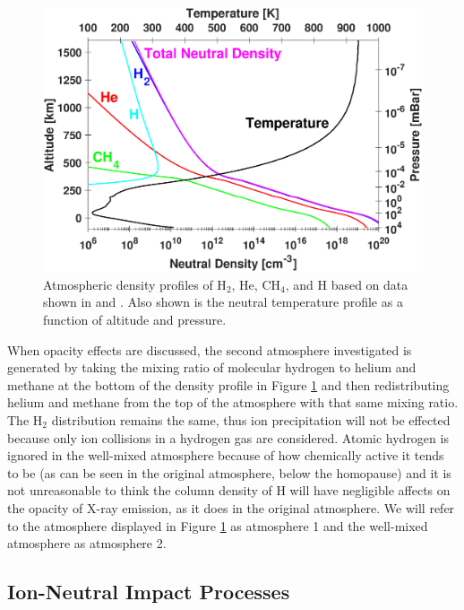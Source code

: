 \documentclass[draft]{agujournal2018}
\begin{document}
\begin{figure}[ht]
\centering
\includegraphics[width=\textwidth]{Figures/Atmosphere.eps}
\caption{Atmospheric density profiles of H$_{2}$, He, CH$_{4}$, and H based on data shown in \citet{maurellis2001} and \citet{sinclair2018}. Also shown is the neutral temperature profile as a function of altitude and pressure.}
\label{fig:atm}
\end{figure}

When opacity effects are discussed, the second atmosphere investigated is generated by taking the mixing ratio of molecular hydrogen to helium and methane at the bottom of the density profile in Figure \ref{fig:atm} and then redistributing helium and methane from the top of the atmosphere with that same mixing ratio.
The H$_{2}$ distribution remains the same, thus ion precipitation will not be effected because only ion collisions in a hydrogen gas are considered.
Atomic hydrogen is ignored in the well-mixed atmosphere because of how chemically active it tends to be (as can be seen in the original atmosphere, below the homopause) and it is not unreasonable to think the column density of H will have negligible affects on the opacity of X-ray emission, as it does in the original atmosphere.
We will refer to the atmosphere displayed in Figure \ref{fig:atm} as atmosphere 1 and the well-mixed atmosphere as atmosphere 2.

\subsection{Ion-Neutral Impact Processes}
\end{document}
